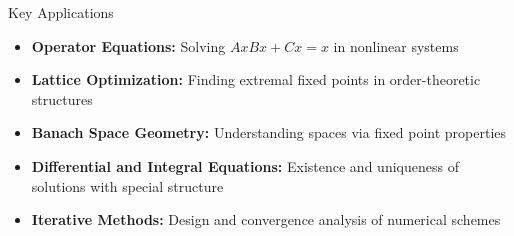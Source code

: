 \documentclass[aspectratio=169,10pt]{beamer}
\begin{document}
\begin{frame}{Key Applications}
  \begin{itemize}
    \item \textbf{Operator Equations:} Solving $AxBx + Cx = x$
      in nonlinear systems

    \vspace{0.2cm}

    \item \textbf{Lattice Optimization:} Finding extremal fixed points
      in order-theoretic structures

    \vspace{0.2cm}

    \item \textbf{Banach Space Geometry:} Understanding spaces via
      fixed point properties

    \vspace{0.2cm}

    \item \textbf{Differential and Integral Equations:} Existence and uniqueness
      of solutions with special structure

    \vspace{0.2cm}

    \item \textbf{Iterative Methods:} Design and convergence analysis of
      numerical schemes
  \end{itemize}
\end{frame}
\end{document}
